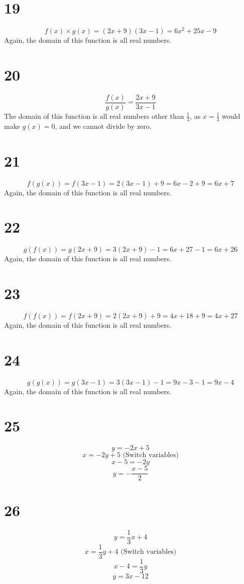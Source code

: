 \documentclass{article}
\theoremstyle{definition}
\newcommand{\?}{\stackrel{?}{=}}
\begin{document}
\section*{19}
\[ f(x)\times g(x)=(2x+9)(3x-1)=6x^2+25x-9 \]
Again, the domain of this function is all real numbers.

\section*{20}
\[ \frac{f(x)}{g(x)}=\frac{2x+9}{3x-1} \]
The domain of this function is all real numbers other than $\frac{1}{3}$, as $x=\frac{1}{3}$ would make $g(x)=0$, and we cannot divide by zero.

\section*{21}
\[ f(g(x))=f(3x-1)=2(3x-1)+9=6x-2+9=6x+7 \]
Again, the domain of this function is all real numbers.

\section*{22}
\[ g(f(x))=g(2x+9)=3(2x+9)-1=6x+27-1=6x+26 \]
Again, the domain of this function is all real numbers.

\section*{23}
\[ f(f(x))=f(2x+9)=2(2x+9)+9=4x+18+9=4x+27 \]
Again, the domain of this function is all real numbers.

\section*{24}
\[ g(g(x))=g(3x-1)=3(3x-1)-1=9x-3-1=9x-4 \]
Again, the domain of this function is all real numbers.

\section*{25}
\[ y=-2x+5 \] \[ x=-2y+5 \textrm{ (Switch variables)} \] \[ x-5=-2y \] \[ y=-\frac{x-5}{2} \]

\section*{26}
\[ y=\frac{1}{3}x+4 \] \[ x=\frac{1}{3}y+4 \textrm{ (Switch variables)} \] \[ x-4=\frac{1}{3}y \] \[ y=3x-12 \]
\end{document}

